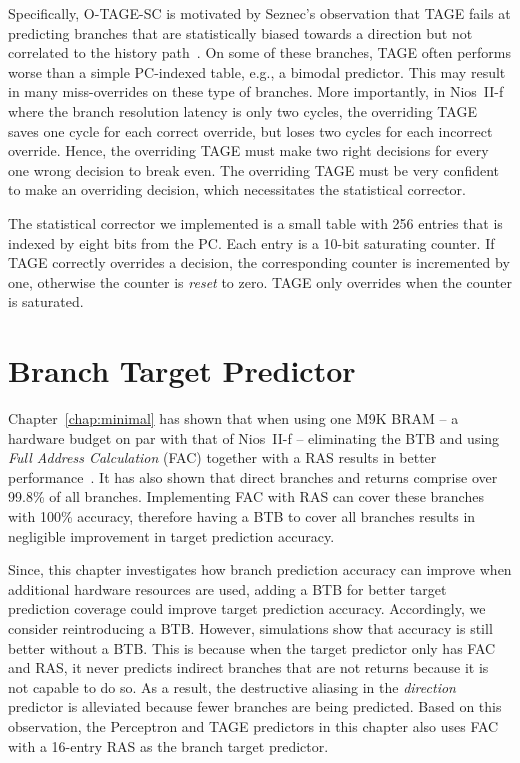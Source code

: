 Specifically, \mbox{O-TAGE-SC} is motivated by Seznec's observation that TAGE fails at predicting branches that are statistically biased towards a direction but not correlated to the history path~\cite{isltage}. On some of these branches, TAGE often performs worse than a simple PC-indexed table, e.g., a bimodal predictor. This may result in many miss-overrides on these type of branches. More importantly, in Nios~II-f where the branch resolution latency is only two cycles, the overriding TAGE saves one cycle for each correct override, but loses two cycles for each incorrect override. Hence, the overriding TAGE must make two right decisions for every one wrong decision to break even. The overriding TAGE must be very confident to make an overriding decision, which necessitates the statistical corrector.

The statistical corrector we implemented is a small table with 256 entries that is indexed by eight bits from the PC. Each entry is a 10-bit saturating counter. If TAGE correctly overrides a decision, the corresponding counter is incremented by one, otherwise the counter is \textit{reset} to zero. TAGE only overrides when the counter is saturated.


\section{Branch Target Predictor}
\label{sec:advanced:target}
Chapter~\ref{chap:minimal} has shown that when using one M9K BRAM -- a hardware budget on par with that of Nios~II-f -- eliminating the BTB and using \textit{Full Address Calculation} (FAC) together with a RAS results in better performance~\cite{grselect}. It has also shown that direct branches and returns comprise over 99.8\% of all branches. Implementing FAC with RAS can cover these branches with 100\% accuracy, therefore having a BTB to cover all branches results in negligible improvement in target prediction accuracy.

Since, this chapter investigates how branch prediction accuracy can improve when additional hardware resources are used, adding a BTB for better target prediction coverage could improve target prediction accuracy. Accordingly, we consider reintroducing a BTB. However, simulations show that accuracy is still better without a BTB. This is because when the target predictor only has FAC and RAS, it never predicts indirect branches that are not returns because it is not capable to do so. As a result, the destructive aliasing in the \textit{direction} predictor is alleviated because fewer branches are being predicted. Based on this observation, the Perceptron and TAGE predictors in this chapter also uses FAC with a 16-entry RAS as the branch target predictor.




